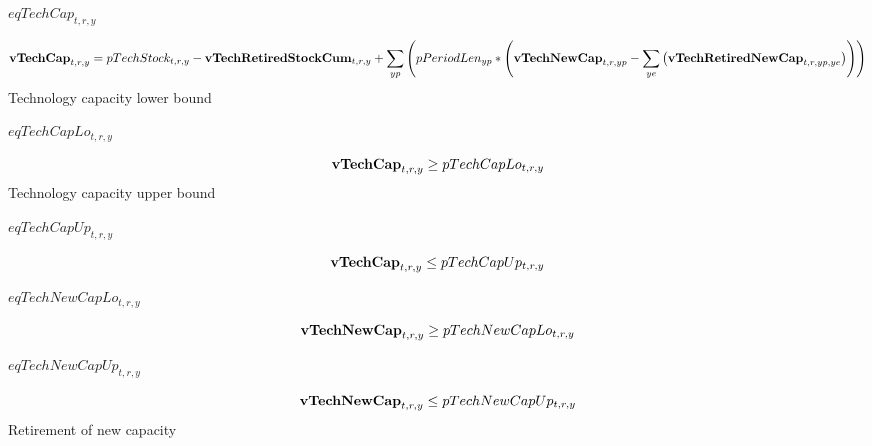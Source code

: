 \documentclass{article}
\begin{document}
$eqTechCap_{t,r,y}$





\begin{dmath} 
{\bf vTechCap}_{t,r,y}  =  pTechStock_{t,r,y}-{\bf vTechRetiredStockCum}_{t,r,y}+\sum_{yp}{\left(pPeriodLen_{yp}*\left({\bf vTechNewCap}_{t,r,yp}-\sum_{ye}{\left({\bf vTechRetiredNewCap}_{t,r,yp,ye}\right)}\right)\right)}
\end{dmath} 
Technology capacity lower bound







$eqTechCapLo_{t,r,y}$





\begin{dmath} 
{\bf vTechCap}_{t,r,y}  \ge  pTechCapLo_{t,r,y}
\end{dmath} 
Technology capacity upper bound







$eqTechCapUp_{t,r,y}$





\begin{dmath} 
{\bf vTechCap}_{t,r,y}  \le  pTechCapUp_{t,r,y}
\end{dmath} 








$eqTechNewCapLo_{t,r,y}$





\begin{dmath} 
{\bf vTechNewCap}_{t,r,y}  \ge  pTechNewCapLo_{t,r,y}
\end{dmath} 








$eqTechNewCapUp_{t,r,y}$





\begin{dmath} 
{\bf vTechNewCap}_{t,r,y}  \le  pTechNewCapUp_{t,r,y}
\end{dmath} 
Retirement of new capacity
\end{document}
